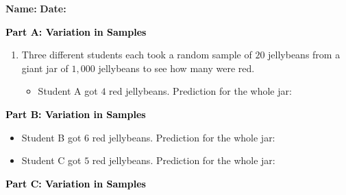 \documentclass[12pt, letterpaper, fleqn]{article}
\newcommand{\blank}{\underline{\hspace{2.2cm}}}
\begin{document}
\textbf{Name:} \underline{\hspace{5cm}}
\hfill
\textbf{Date:} \underline{\hspace{3cm}}\\

\begin{tcolorbox}[colback=customteal!20]
\large\textcolor{black}{\textbf{Part A: Variation in Samples}}
\end{tcolorbox}

\vspace{3mm}

\begin{enumerate}[itemsep=4.2cm, leftmargin=0.6cm]
\item Three different students each took a random sample of $20$ jellybeans from a giant jar of $1,000$ jellybeans to see how many were red.
\begin{itemize}
\item Student A got $4$ red jellybeans. Prediction for the whole jar: \blank
\end{itemize}
\end{enumerate}

\newpage

\begin{tcolorbox}[colback=customteal!20]
\large\textcolor{black}{\textbf{Part B: Variation in Samples}}
\end{tcolorbox}

\vspace{3mm}

\begin{enumerate}[itemsep=4.2cm, leftmargin=0.6cm, resume]
\begin{itemize}
\item Student B got $6$ red jellybeans. Prediction for the whole jar: \blank
\item Student C got $5$ red jellybeans. Prediction for the whole jar: \blank
\end{itemize}
\end{enumerate}

\newpage

\begin{tcolorbox}[colback=customteal!20]
\large\textcolor{black}{\textbf{Part C: Variation in Samples}}
\end{tcolorbox}

\vspace{3mm}
\end{document}

